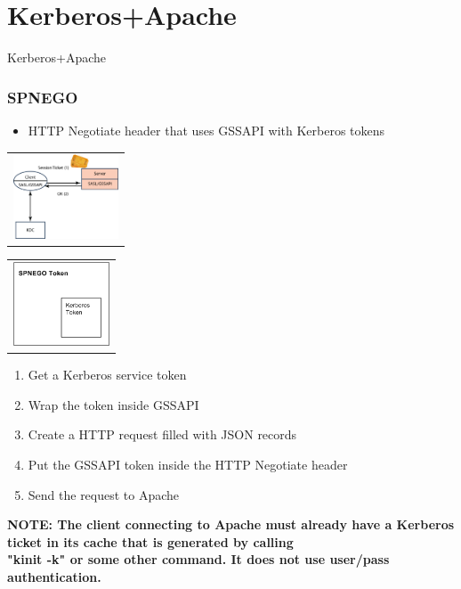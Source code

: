\documentclass{beamer}
\begin{document}
\section{Kerberos+Apache}
\begin{frame}[c]
\begin{center}
\Huge \textcolor{BrickRed}{Kerberos+Apache}
\end{center}
\end{frame}

\begin{frame}[t, fragile]
\frametitle{SPNEGO}
\begin{itemize}
\item HTTP Negotiate header that uses GSSAPI with Kerberos tokens
\end{itemize}
\begin{center}
\begin{tabular}{c}
\includegraphics[height=2.5cm]{kerberos4.png}
\end{tabular}
\begin{tabular}{c}
\includegraphics[height=2.5cm]{spnego.png}
\end{tabular}
\end{center}
\begin{enumerate}
\item Get a Kerberos service token
\item Wrap the token inside GSSAPI
\item Create a HTTP request filled with JSON records
\item Put the GSSAPI token inside the HTTP Negotiate header
\item Send the request to Apache
\end{enumerate}
{
\tiny \textbf{NOTE: The client connecting to Apache must already have a Kerberos ticket in its cache that is generated by calling \\ "kinit -k" or some other command. It does not use user/pass authentication.} 
}
\end{frame}
\end{document}
